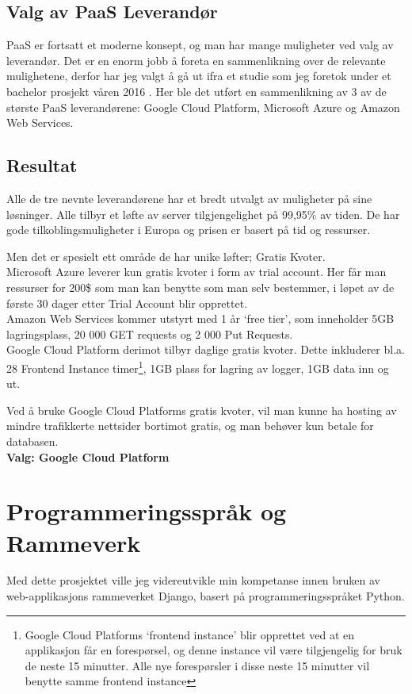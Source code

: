 \subsection{Valg av PaaS Leverandør}
PaaS er fortsatt et moderne konsept, og man har mange muligheter ved valg av leverandør. Det er en enorm jobb å foreta en sammenlikning over de relevante mulighetene, derfor har jeg valgt å gå ut ifra et studie som jeg foretok under et bachelor prosjekt våren 2016 \cite[s. 18]{bachelor}. Her ble det utført en sammenlikning av 3 av de største PaaS leverandørene: Google Cloud Platform, Microsoft Azure og Amazon Web Services. 


\subsection*{Resultat}
Alle de tre nevnte leverandørene har et bredt utvalgt av muligheter på sine løsninger. Alle tilbyr et løfte av server tilgjengelighet på 99,95\% av tiden. De har gode tilkoblingsmuligheter i Europa og prisen er basert på tid og ressurser.

Men det er spesielt ett område de har unike løfter; Gratis Kvoter. \\
Microsoft Azure leverer kun gratis kvoter i form av trial account. Her får man ressurser for 200\$ som man kan benytte som man selv bestemmer, i løpet av de første 30 dager etter Trial Account blir opprettet.\\
Amazon  Web Services kommer utstyrt med 1 år ‘free tier’, som inneholder 5GB lagringsplass, 20 000 GET requests og 2 000 Put Requests.\\
Google Cloud Platform derimot tilbyr daglige gratis kvoter. Dette inkluderer bl.a. 28 Frontend Instance timer\footnote{Google Cloud Platforms ‘frontend instance’ blir opprettet ved at en applikasjon får en forespørsel, og denne instance vil være tilgjengelig for bruk de neste 15 minutter. Alle nye forespørsler i disse neste 15 minutter vil benytte samme frontend instance}, 1GB plass for lagring av logger, 1GB data inn og ut.


Ved å bruke Google Cloud Platforms gratis kvoter, vil man kunne ha hosting av mindre trafikkerte nettsider bortimot gratis, og man behøver kun betale for databasen.\\
\textbf{Valg: Google Cloud Platform}



\newpage
\section{Programmeringsspråk og Rammeverk}
Med dette prosjektet ville jeg videreutvikle min kompetanse innen bruken av web-applikasjons rammeverket Django, basert på programmeringsspråket Python. 
